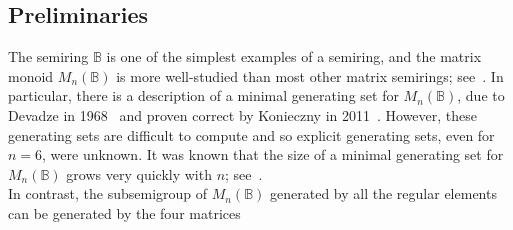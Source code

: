 \documentclass[11pt]{article}
\numberwithin{equation}{section}
\newcommand{\B}{\mathbb{B}}
\newcommand{\Bn}{M_n(\B)}
\begin{document}
\subsection{Preliminaries}
The semiring $\B$ is one of the simplest examples of a semiring, and the matrix
monoid $\Bn$ is more well-studied than most other matrix semirings;
see~\cite{TODO}. In particular, there is a description of a minimal generating
set for $\Bn$, due to Devadze in 1968~\cite{Devadze??} and proven correct by
Konieczny in 2011~\cite{Konieczny2011aa}. However, these generating sets are difficult to
compute and so explicit generating sets, even for $n = 6$, were unknown. It was
known that the size of a minimal generating set for $\Bn$ grows very quickly
with $n$; see~.\\

In contrast, the subsemigroup of $\Bn$ generated by all the regular elements can
be generated by the four matrices \cite{Roush1977aa}
\end{document}
